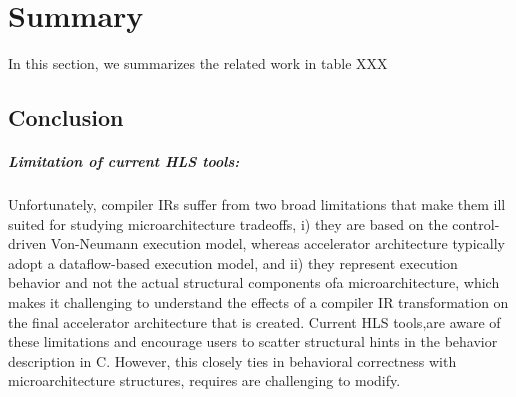 
\chapter{Summary}


In this section, we summarizes the related work in table XXX

\section{Conclusion} 
\paragraph{Limitation of current HLS tools:}
Unfortunately, compiler IRs suffer from two broad limitations that make them ill suited for studying microarchitecture tradeoffs, i) they are based on the control-driven Von-Neumann execution  model,  whereas  accelerator  architecture  typically adopt a dataflow-based execution model, and ii) they represent execution behavior and not the actual structural components ofa microarchitecture, which makes it challenging to understand the  effects  of  a  compiler  IR  transformation  on  the  final accelerator  architecture  that  is  created.
 Current  HLS  tools,are aware of these limitations and encourage users to scatter structural hints in the behavior description in C. However, this closely ties in behavioral correctness with microarchitecture structures, requires are challenging to modify.